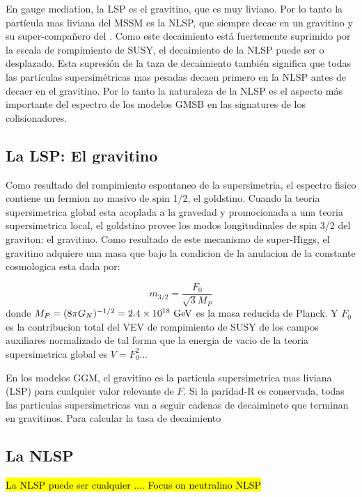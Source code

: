 En gauge mediation, la LSP es el gravitino, que es muy liviano. Por lo tanto la partícula
mas liviana del MSSM es la NLSP, que siempre decae en un gravitino y su super-compa\~nero
del {\SM}. Como este decaimiento está fuertemente suprimido por la escala de rompimiento
de SUSY, el decaimiento de la NLSP puede ser  o desplazado. Esta supresión de
la taza de decaimiento también significa que todas las partículas supersimétricas mas pesadas
decaen primero en la NLSP antes de decaer en el gravitino. Por lo tanto la naturaleza de
la NLSP es el aspecto más importante del espectro de los modelos GMSB en las signatures
de los colisionadores.

\subsection{La LSP: El gravitino}

Como resultado del rompimiento espontaneo de la supersimetria, el espectro fisico
contiene un fermion no masivo de spin 1/2, el goldstino. Cuando la teoria supersimetrica
global esta acoplada a la gravedad y promocionada a una teoria supersimetrica local,
el goldstino provee los modos longitudinales de spin 3/2 del graviton: el gravitino.
Como resultado de este mecanismo de super-Higgs, el gravitino adquiere una masa
que bajo la condicion de la anulacion de la constante cosmologica esta dada por:

\begin{equation}
  m_{3/2} = \frac{F_0}{\sqrt{3}M_P}
\end{equation}
%
donde $M_P = (8\pi G_N)^{-1/2} = 2.4 \times 10^{18} \gev$ es la masa reducida de Planck.
Y $F_0$ es la contribucion total del VEV de rompimiento de SUSY de los campos auxiliares
normalizado de tal forma que la energia de vacio de la teoria supersimetrica global es
$V = F_0^2$...

En los modelos GGM, el gravitino es la particula supersimetrica mas liviana  (LSP) para
cualquier valor relevante de $F$. Si la paridad-R es conservada, todas las particulas
supersimetricas van a seguir cadenas de decaimineto que terminan en gravitinos. Para
calcular la tasa de decaimiento


\subsection{La NLSP}

\hl{La NLSP puede ser cualquier .... Focus on neutralino NLSP}

